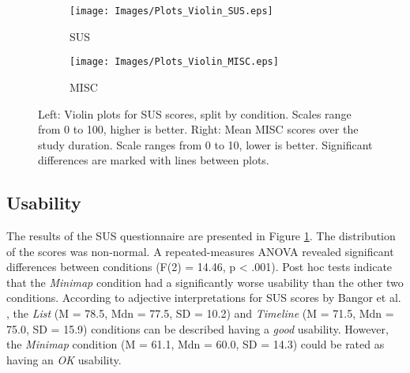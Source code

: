 \begin{figure*}[h]
    \centering
    \begin{subfigure}[b]{.45\textwidth}
        \centering
        \texttt{[image: Images/Plots\_Violin\_SUS.eps]}
        \caption{SUS}
        \label{fig:results_SUS}
    \end{subfigure}
    \hfill
    \begin{subfigure}[b]{.45\textwidth}
        \centering
        \texttt{[image: Images/Plots\_Violin\_MISC.eps]}
        \caption{MISC}
        \label{fig:results_MISC}
    \end{subfigure}
    \caption{Left: Violin plots for SUS scores, split by condition. Scales range from 0 to 100, higher is better. Right: Mean MISC scores over the study duration. Scale ranges from 0  to 10, lower is better. Significant differences are marked with lines between plots.}
    \label{fig:results_SUS_MISC}
\end{figure*}




\subsection{Usability}
The results of the SUS questionnaire are presented in Figure \ref{fig:results_SUS}. The distribution of the scores was non-normal. A repeated-measures ANOVA revealed significant differences between conditions (F(2) = 14.46, p < .001). Post hoc tests indicate that the \textit{Minimap} condition had a significantly worse usability than the other two conditions. According to adjective interpretations for SUS scores by Bangor et al. \cite{bangor2009sus}, the  \textit{List} (M = 78.5, Mdn = 77.5, SD = 10.2) and \textit{Timeline} (M = 71.5, Mdn = 75.0, SD = 15.9) conditions can be described having a \textit{good} usability. However, the \textit{Minimap} condition (M = 61.1, Mdn = 60.0, SD = 14.3) could be rated as having an \textit{OK} usability.




